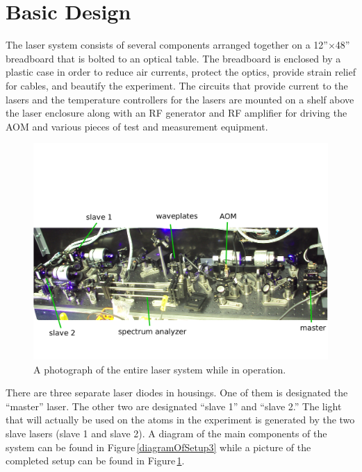 \section{Basic Design}
The laser system consists of several components arranged together on a 12''$\times$48'' breadboard that is bolted to an optical table. The breadboard is enclosed by a plastic case in order to reduce air currents, protect the optics, provide strain relief for cables, and beautify the experiment. The circuits that provide current to the lasers and the temperature controllers for the lasers are mounted on a shelf above the laser enclosure along with an RF generator and RF amplifier for driving the AOM and various pieces of test and measurement equipment.  
\begin{figure}
    \centerline{\includegraphics[width=1\textwidth]{entire_setup}}
    \caption[Photo of Entire System]{\label{fullexperimentphoto}
A photograph of the entire laser system while in operation.
    }
\end{figure}

There are three separate laser diodes in housings. One of them is designated the ``master'' laser. The other two are designated ``slave 1'' and ``slave 2.'' The light that will actually be used on the atoms in the experiment is generated by the two slave lasers (slave 1 and slave 2).
 A diagram of the main components of the system can be found in Figure\,\ref{diagramOfSetup3} while a picture of the completed setup can be found in Figure\,\ref{fullexperimentphoto}. 

